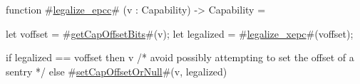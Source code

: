 function #\hyperref[sailRISCVzlegalizzezyepcc]{legalize\_epcc}# (v : Capability) -> Capability = {
  let voffset = #\hyperref[sailRISCVzgetCapOffsetBits]{getCapOffsetBits}#(v);
  let legalized = #\hyperref[sailRISCVzlegalizzezyxepc]{legalize\_xepc}#(voffset);

  if   legalized == voffset
  then v /* avoid possibly attempting to set the offset of a sentry */
  else #\hyperref[sailRISCVzsetCapOffsetOrNull]{setCapOffsetOrNull}#(v, legalized)
}
